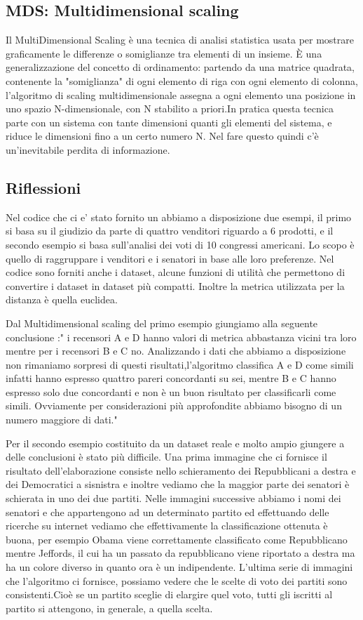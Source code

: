 			\subsection{MDS: Multidimensional scaling}
				Il MultiDimensional Scaling è una tecnica di analisi statistica usata per mostrare graficamente le differenze o somiglianze tra elementi di un insieme.   È una generalizzazione del concetto di ordinamento: partendo da una matrice quadrata, contenente la "somiglianza" di ogni elemento di riga con ogni elemento di colonna, l'algoritmo di scaling multidimensionale assegna a ogni elemento una posizione in uno spazio N-dimensionale, con N stabilito a priori.In pratica questa tecnica parte con un sistema con tante dimensioni quanti gli elementi del sistema, e riduce le dimensioni fino a un certo numero N. Nel fare questo quindi c'è un'inevitabile perdita di informazione.
			\subsection{Riflessioni }		
				Nel codice che ci e' stato fornito un abbiamo a disposizione due esempi, il primo si basa su il giudizio da parte di quattro venditori riguardo a 6 prodotti, e il secondo esempio si basa sull'analisi dei voti di 10 congressi americani.
				Lo scopo è quello di raggruppare i venditori e i senatori in base alle loro preferenze.
				Nel codice sono forniti anche i dataset, alcune funzioni di utilità che permettono di convertire i dataset in dataset più compatti.
				Inoltre la metrica utilizzata per la distanza è quella euclidea.
				
				Dal Multidimensional scaling del primo esempio giungiamo alla seguente conclusione :" i recensori A e D hanno valori di metrica abbastanza vicini tra loro mentre per i recensori B e C no.
				Analizzando i dati che abbiamo a disposizione non rimaniamo sorpresi di questi risultati,l'algoritmo classifica A e D come simili infatti hanno espresso quattro pareri concordanti su sei, mentre B e C hanno espresso solo due concordanti e non è un buon risultato per classificarli come simili.
				Ovviamente per considerazioni più approfondite abbiamo bisogno di un numero maggiore di dati."
				
				Per il secondo esempio costituito da un dataset reale e molto ampio giungere a delle conclusioni è stato più difficile.
				Una prima immagine che ci fornisce il risultato dell'elaborazione consiste nello schieramento dei Repubblicani a destra e dei Democratici a sisnistra e inoltre vediamo che la maggior parte dei senatori è schierata in uno dei due partiti.
				Nelle immagini successive abbiamo i nomi dei senatori e che appartengono ad un determinato partito ed effettuando delle ricerche su internet vediamo che effettivamente la classificazione ottenuta è buona, per esempio Obama viene correttamente classificato come Repubblicano mentre Jeffords, il cui ha un passato da repubblicano viene riportato a destra ma ha un colore diverso in quanto ora è un indipendente.
				L'ultima serie di immagini che l'algoritmo ci fornisce, possiamo vedere che le scelte di voto dei partiti sono consistenti.Cioè se un partito sceglie di elargire quel voto, tutti gli iscritti al partito si attengono, in generale, a quella scelta.
